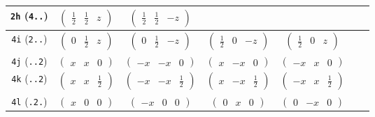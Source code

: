 \documentclass[fleqn,9pt,landscape]{jsarticle}
\begin{document}
\begin{center}
\begin{longtable}{ccccccc}
{\tt 2h} ({\tt 4..}) & $ \begin{pmatrix} \frac{1}{2} & \frac{1}{2} & z \end{pmatrix} $ & $ \begin{pmatrix} \frac{1}{2} & \frac{1}{2} & - z \end{pmatrix} $ & $  $ & $  $ & $  $ & $  $ \\ \hline
{\tt 4i} ({\tt 2..}) & $ \begin{pmatrix} 0 & \frac{1}{2} & z \end{pmatrix} $ & $ \begin{pmatrix} 0 & \frac{1}{2} & - z \end{pmatrix} $ & $ \begin{pmatrix} \frac{1}{2} & 0 & - z \end{pmatrix} $ & $ \begin{pmatrix} \frac{1}{2} & 0 & z \end{pmatrix} $ & $  $ & $  $ \\ \hline
{\tt 4j} ({\tt ..2}) & $ \begin{pmatrix} x & x & 0 \end{pmatrix} $ & $ \begin{pmatrix} - x & - x & 0 \end{pmatrix} $ & $ \begin{pmatrix} x & - x & 0 \end{pmatrix} $ & $ \begin{pmatrix} - x & x & 0 \end{pmatrix} $ & $  $ & $  $ \\ \hline
{\tt 4k} ({\tt ..2}) & $ \begin{pmatrix} x & x & \frac{1}{2} \end{pmatrix} $ & $ \begin{pmatrix} - x & - x & \frac{1}{2} \end{pmatrix} $ & $ \begin{pmatrix} x & - x & \frac{1}{2} \end{pmatrix} $ & $ \begin{pmatrix} - x & x & \frac{1}{2} \end{pmatrix} $ & $  $ & $  $ \\ \hline
{\tt 4l} ({\tt .2.}) & $ \begin{pmatrix} x & 0 & 0 \end{pmatrix} $ & $ \begin{pmatrix} - x & 0 & 0 \end{pmatrix} $ & $ \begin{pmatrix} 0 & x & 0 \end{pmatrix} $ & $ \begin{pmatrix} 0 & - x & 0 \end{pmatrix} $ & $  $ & $  $ \\ \hline

\end{longtable}
\end{center}
\end{document}

